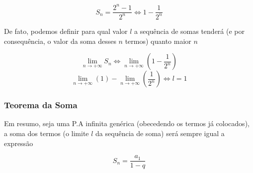 \documentclass[11pt]{article}
\begin{document}
\[S_{n} = \frac{2^{n} - 1}{2^{n}} \Leftrightarrow 1 - \frac{1}{2^{n}}\]

De fato, podemos definir para qual valor $l$ a sequência de somas tenderá (e por consequência, o valor da soma desses $n$ termos) quanto maior $n$

\[\lim_{n \to +\infty} S_{n} \Leftrightarrow \lim_{n\to +\infty} \left(1 - \frac{1}{2^{n}}\right)\]
\[\lim_{n\to +\infty} (1) - \lim_{n\to +\infty} \left(\frac{1}{2^{n}}\right) \Leftrightarrow l = 1\]

\subsubsection{Teorema da Soma}

Em resumo, seja uma P.A infinita genérica (obecedendo os termos já colocados), a soma dos termos (o limite $l$ da sequência de soma) será sempre igual a expressão

\begin{tcolorbox}[colback=LightYellow]
\[S_{n} = \frac{a_{1}}{1 - q}\]
\end{tcolorbox}
\end{document}
